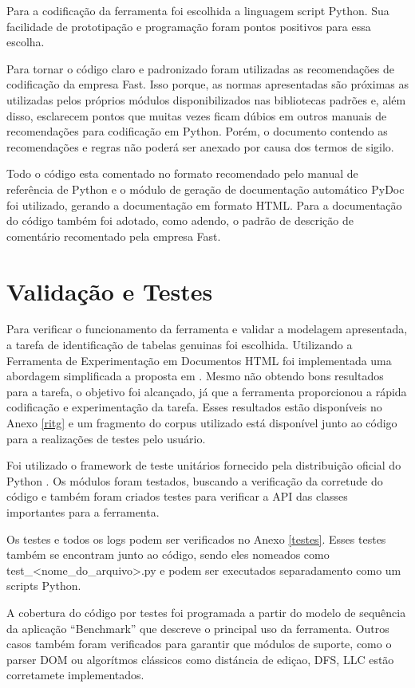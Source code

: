 \documentclass[12pt, a4paper]{article}
\begin{document}
Para a codificação da ferramenta foi escolhida a linguagem script
Python. Sua facilidade de prototipação e programação foram pontos
positivos para essa escolha.

Para tornar o código claro e padronizado foram utilizadas as
recomendações de codificação da empresa Fast.
Isso porque, as normas apresentadas são próximas as utilizadas pelos 
próprios módulos disponibilizados nas bibliotecas padrões e, além disso,
esclarecem pontos que muitas vezes ficam dúbios em outros manuais de 
recomendações para codificação em Python. Porém,
  o documento contendo as recomendações e regras não
  poderá ser anexado por causa dos termos de sigilo. 

Todo o código esta comentado no formato recomendado pelo manual de
referência de Python e o  módulo de geração de documentação automático
PyDoc foi utilizado, gerando a documentação em formato HTML. Para a
documentação do código também foi adotado, como adendo, o padrão de 
descrição de comentário recomentado pela empresa Fast.

\section{Validação e Testes}

Para verificar o funcionamento da ferramenta e validar a modelagem apresentada,
a tarefa de identificação de tabelas genuinas foi escolhida. Utilizando a
Ferramenta de Experimentação em Documentos HTML foi implementada uma abordagem
simplificada a proposta em \cite{LGZ2003}. Mesmo não obtendo bons resultados
para a tarefa, o objetivo foi alcançado, já que a ferramenta proporcionou a
rápida codificação e experimentação da tarefa. Esses resultados estão
disponíveis no Anexo \ref{ritg} e um fragmento do corpus utilizado está disponível junto ao código para a realizações de testes pelo usuário.

Foi utilizado o framework de teste unitários fornecido pela distribuição
oficial do Python \cite{UTest}. Os módulos foram testados, buscando a verificação
da corretude do código e também foram criados testes para verificar a
API das classes importantes para a ferramenta.

Os testes e todos os logs podem ser verificados no Anexo \ref{testes}. Esses testes
também se encontram junto ao código, sendo eles nomeados como
test\_<nome\_do\_arquivo>.py e podem ser executados separadamento como
um scripts Python.

A cobertura do código por testes foi programada a partir do modelo de
sequência da aplicação ``Benchmark'' que descreve o principal uso da
ferramenta. Outros casos também foram verificados para garantir que
módulos de suporte, como o parser DOM ou algorítmos clássicos como
distáncia de ediçao, DFS, LLC estão corretamete
implementados.
\end{document}
